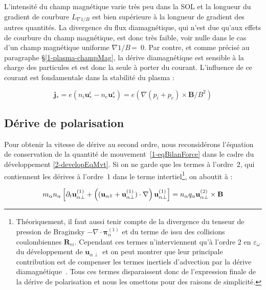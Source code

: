 \begin{refsection}
L'intensité du champ magnétique varie très peu dans la SOL et la longueur du
gradient de courbure $L_{\nabla 1/B}$ est bien supérieure à la longueur de
gradient des autres quantités. La divergence du flux diamagnétique, qui n'est
due qu'aux effets de courbure du champ magnétique, est donc très faible, voir
nulle dans le cas d'un champ magnétique uniforme $\nabla1/B\,$=~0.
Par contre, et comme précisé au paragraphe \S\ref{1-plasma-champMag}, la dérive
diamagnétique est sensible à la charge des particules et est donc la seule à porter du courant.
L'influence de ce courant est fondamentale dans la stabilité du plasma :

\begin{equation}
\mathbf j_*=e(n_i\mathbf u^i_*-n_e\mathbf
u^e_*)=e(\nabla(p_i+p_e)\times\mathbf B/B^2)
\end{equation}



\subsection{Dérive de polarisation}

Pour obtenir la vitesse de dérive au second ordre, nous reconsidérons
l'équation de conservation de la quantité de mouvement~\eqref{1-eqBilanForce}
dans le cadre du développement \eqref{2-developEqMvt}. Si on
ne garde que les termes à l'ordre~2, qui contiennent les dérives à l'ordre~1
dans le terme intertiel\footnote{\label{2-footnoteBraginsky}Théoriquement, il faut aussi
tenir compte de la divergence du tenseur de pression de Braginsky
$-\nabla\cdot\boldsymbol{\pi}^{(1)}_\alpha$ et du terme de issu des collisions
coulombiennes $\mathbf R_{ei}$. Cependant ces termes
n'interviennent qu'à l'ordre 2 en
$\varepsilon_\omega$ du développement de $\mathbf u_{\alpha\perp}$ et on peut
montrer que leur principale contribution est de compenser les termes inertiels
d'advection par la dérive diamagnétique~\parencite{Tamain2}. Tous ces termes
disparaissent donc de l'expression finale de la dérive de polarisation et
nous les omettons pour des raisons de simplicité.}, on aboutit à :

\begin{equation}
m_\alpha n_\alpha\left[\partial_t \mathbf{u}^{(1)}_{\alpha\perp} +
\left((\mathbf{u}_{\alpha\para}+\mathbf
u^{(1)}_{\alpha\perp})\cdot\nabla\right)\mathbf{u}^{(1)}_{\alpha\perp}\right]
=n_\alpha q_\alpha\mathbf u^{(2)}_{\alpha\perp}\times \mathbf
B
\end{equation}


\end{refsection}

